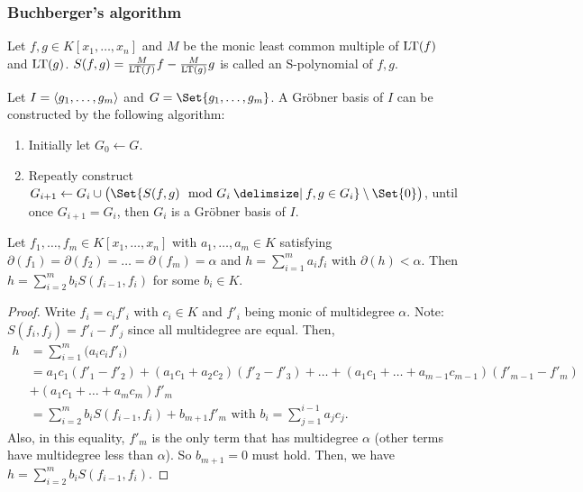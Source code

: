 \subsubsection{Buchberger's algorithm}

\begin{definition}
  Let $f,g \in K[x_1,\dots,x_n]$ and $M$ be the monic least common multiple of
  $\operatorname{LT}(f)$ and $\operatorname{LT}(g)$. $S(f,g) = \frac{M}{\operatorname{LT}(f)}f - \frac{M}{\operatorname{LT}(g)}g$ is
  called an S-polynomial of $f, g$.
\end{definition}

Let $I = \langle g_1, \dots, g_m \rangle$ and $G = \Set{ g_1, \dots, g_m }$.
A Gr\"{o}bner basis of $I$ can be constructed by the following algorithm:
\begin{enumerate}
  \item Initially let $G_0 \gets G$.
  \item Repeatly construct $G_{i+1} \gets G_i \cup \big(
    \Set{S(f, g) \mod G_i \given f, g \in G_i} \setminus \Set{0} \big)$,
    until once $G_{i+1} = G_i$, then $G_i$ is a Gr\"{o}bner basis of $I$.
\end{enumerate}

\begin{lemma} \label{lemma:sum-of-equal-degree-f-is-less}
  Let $f_1, \dots, f_m \in K[x_1, \dots, x_n]$ with $a_1, \dots, a_m \in K$
  satisfying $\partial(f_1) = \partial(f_2) = \dots = \partial(f_m) = \alpha$
  and $h =\sum_{i = 1}^m a_i f_i $ with $\partial(h) < \alpha$.
  Then $h = \sum_{i = 2}^m b_i S(f_{i-1}, f_i)$ for some $b_i \in K$.
  \begin{proof}
    Write $f_i = c_if'_i$ with $c_i \in K$ and $f'_i$ being monic of multidegree
    $\alpha$. Note: $S(f_i, f_j) = f'_i - f'_j$ since all multidegree are
    equal. Then, 
    \[
      \begin{split}
        h &= \sum_{i=1}^m \big( a_ic_if'_i \big) \\
        &= a_1c_1(f'_1-f'_2) + (a_1c_1+a_2c_2)(f'_2-f'_3) + \dots +
        (a_1c_1 + \dots + a_{m-1}c_{m-1})(f'_{m-1}-f'_m) \\
        &+ (a_1c_1+\dots+a_mc_m)f'_m \\
        &= \sum\limits_{i=2}^m b_iS(f_{i-1},f_i) + b_{m+1}f'_m\text{ with }
        b_i = \sum_{j=1}^{i-1}a_jc_j.
      \end{split}
    \]
    Also, in this equality, $f'_m$ is the only term that has multidegree $\alpha$
    (other terms have multidegree less than $\alpha$). So $b_{m+1} = 0$ must hold.
    Then, we have $h = \sum_{i = 2}^m b_i S(f_{i-1}, f_i)$.
  \end{proof}
\end{lemma}

